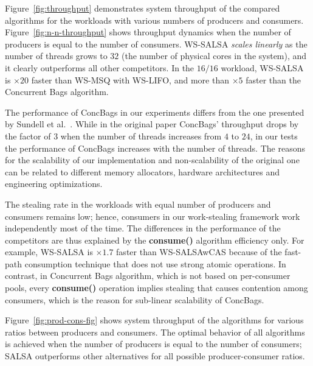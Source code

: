 Figure~\ref{fig:throughput} demonstrates system throughput of the compared algorithms for the workloads with various numbers of producers and consumers. 
Figure~\ref{fig:n-n-throughput} shows throughput dynamics when the number of producers is equal to the number of consumers. WS-SALSA \emph{scales linearly} as the number of threads grows to $32$ (the number of physical cores in the system), and it clearly outperforms all other competitors. In the $16/16$ workload, WS-SALSA is $\times20$ faster than WS-MSQ with WS-LIFO, and more than $\times5$ faster than the Concurrent Bags algorithm. 

The performance of ConcBags in our experiments differs from the one presented by Sundell et al.~\cite{Sundell:2011:LAC:1989493.1989550}. 
While in the original paper ConcBags' throughput drops by the factor of $3$ when the number of threads increases from $4$ to $24$, in our tests the performance of ConcBags increases with the number of threads. The reasons for the scalability of our implementation and non-scalability of the original one can be related to different memory allocators, hardware architectures and engineering optimizations. %

The stealing rate in the workloads with equal number of producers and consumers remains low; hence, consumers in our work-stealing framework work independently most of the time. The differences in the performance of the competitors are thus explained by the {\bf consume()} algorithm efficiency only. 
For example, WS-SALSA is $\times1.7$ faster than WS-SALSAwCAS because of the fast-path consumption technique that does not use strong atomic operations. 
In contrast, in Concurrent Bags algorithm, which is not based on per-consumer pools, every {\bf consume()} operation implies stealing that causes contention among consumers, which is the reason for sub-linear scalability of ConcBags.

Figure~\ref{fig:prod-cons-fig} shows system throughput of the algorithms for various ratios between producers and consumers. The optimal behavior of all algorithms is achieved when the number of producers is equal to the number of consumers; SALSA outperforms other alternatives for all possible producer-consumer ratios. 

